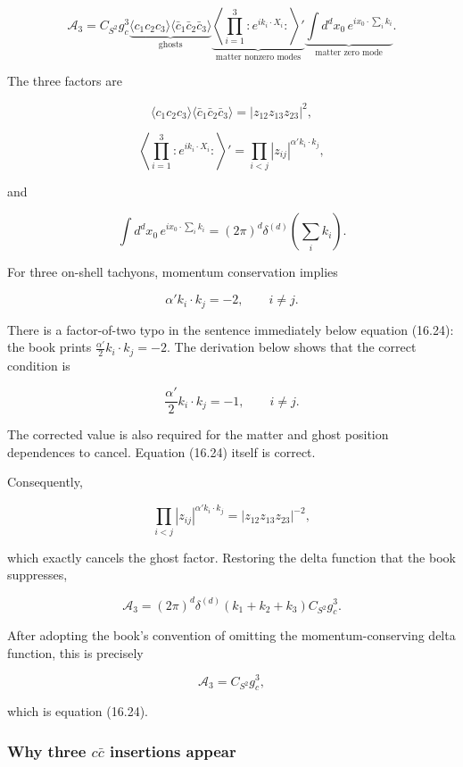 \documentclass[
  10pt,
  a4paper,
  openany]{book}
\begin{document}
\[
\mathcal A_3
=C_{S^2}g_c^3
\underbrace{\langle c_1c_2c_3\rangle
\langle\bar c_1\bar c_2\bar c_3\rangle}_{\text{ghosts}}
\underbrace{\left\langle\prod_{i=1}^3:e^{ik_i\cdot X_i}:\right\rangle'}_{\text{matter nonzero modes}}
\underbrace{\int d^dx_0\,e^{ix_0\cdot\sum_i k_i}}_{\text{matter zero mode}}.
\]

The three factors are

\[
\langle c_1c_2c_3\rangle
\langle\bar c_1\bar c_2\bar c_3\rangle
=|z_{12}z_{13}z_{23}|^2,
\]

\[
\left\langle\prod_{i=1}^3:e^{ik_i\cdot X_i}:\right\rangle'
=\prod_{i<j}|z_{ij}|^{\alpha'k_i\cdot k_j},
\]

and

\[
\int d^dx_0\,e^{ix_0\cdot\sum_i k_i}
=(2\pi)^d\delta^{(d)}\!\left(\sum_i k_i\right).
\]

For three on-shell tachyons, momentum conservation implies

\[
\alpha'k_i\cdot k_j=-2,
\qquad i\neq j.
\]

There is a factor-of-two typo in the sentence immediately below equation
(16.24): the book prints \(\frac{\alpha'}2k_i\cdot k_j=-2\). The
derivation below shows that the correct condition is

\[
\boxed{
\frac{\alpha'}2k_i\cdot k_j=-1,
\qquad i\neq j.
}
\]

The corrected value is also required for the matter and ghost position
dependences to cancel. Equation (16.24) itself is correct.

Consequently,

\[
\prod_{i<j}|z_{ij}|^{\alpha'k_i\cdot k_j}
=|z_{12}z_{13}z_{23}|^{-2},
\]

which exactly cancels the ghost factor. Restoring the delta function
that the book suppresses,

\[
\boxed{
\mathcal A_3
=(2\pi)^d\delta^{(d)}(k_1+k_2+k_3)
C_{S^2}g_c^3.
}
\]

After adopting the book's convention of omitting the momentum-conserving
delta function, this is precisely

\[
\boxed{
\mathcal A_3=C_{S^2}g_c^3,
}
\]

which is equation (16.24).

\subsubsection{\texorpdfstring{Why three \(c\bar c\) insertions
appear}{Why three c\textbackslash bar c insertions appear}}\label{why-three-cbar-c-insertions-appear}
\end{document}
